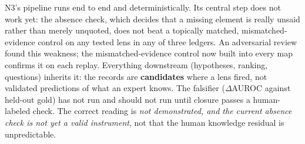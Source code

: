 \begin{findingbox}
N3's pipeline runs end to end and deterministically. Its central step does not work yet: the
absence check, which decides that a missing element is really unsaid rather than merely unquoted,
does not beat a topically matched, mismatched-evidence control on any tested lens in any of three ledgers. An
adversarial review found this weakness; the mismatched-evidence control now built into every map confirms it on
each replay. Everything downstream (hypotheses, ranking, questions) inherits it: the records are
\textbf{candidates} where a lens fired, not validated predictions of what an expert knows. The
falsifier ($\Delta$AUROC against held-out gold) has not run and should not run until closure passes a
human-labeled check. The correct reading is \emph{not demonstrated, and the current absence check is
not yet a valid instrument}, not that the human knowledge residual is unpredictable.
\end{findingbox}
